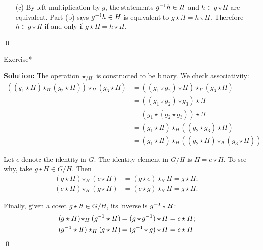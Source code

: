 \documentclass[../algebraNotesMSRI-UP2016.tex]{subfiles}
\begin{document}
\begin{frame}[c]
\begin{itemize}
\item[(c)] By left multiplication by $g$, the statements $g^{-1}h\in H$ and $h\in g\star H$ are equivalent.  Part {(b)} says $g^{-1}h\in H$ is equivalent to $g\star H=h\star H$.  Therefore $h\in g\star H$ if and only if $g\star H=h\star H$.
\end{itemize}
\qed
\end{frame}

\begin{frame}
\begin{block}{Exercise*}\end{block}
\vspace{-0.75pc}
\textbf{Solution:}
The operation $\star_{/H}$ is constructed to be binary.  We check associativity:
\begin{align*}
\left((g_1\star H)\star_{H}(g_2\star H)\right)\star_{H}(g_3\star H) &= \left((g_1\star g_2)\star H\right)\star_H(g_3\star H) \\
	&= \left((g_1\star g_2)\star g_3\right)\star H \\
	&= \left(g_1\star (g_2\star g_3)\right)\star H \\
	&= (g_1\star H)\star_H\left((g_2\star g_3)\star H\right) \\
	&= (g_1\star H)\star_H\left((g_2\star H)\star_H(g_3\star H)\right)
\end{align*}

Let $e$ denote the identity in $G$.  The identity element in $G/H$ is $H= e\star H$.  To see why, take $g\star H\in G/H$.  Then
\begin{align*}
(g\star H)\star_H (e\star H) &= (g\star e)\star_H H = g\star H; \\
(e\star H)\star_H (g\star H) &= (e\star g)\star_H H = g\star H.
\end{align*}

\smallGap
Finally, given a coset $g\star H\in G/H$, its inverse is $g^{-1}\star H$:
\begin{align*}
(g\star H)\star_H(g^{-1}\star H) &= (g\star g^{-1})\star H = e\star H; \\
(g^{-1} \star H)\star_H(g\star H) &= (g^{-1} \star g)\star H = e\star H 
\end{align*}
\qed
\end{frame}
\end{document}
